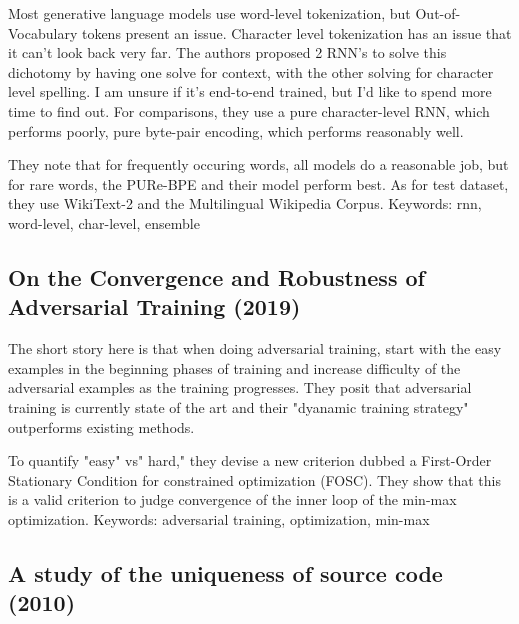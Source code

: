 \documentclass{article}
\begin{document}
Most generative language models use word-level tokenization, but Out-of-Vocabulary tokens present an issue. Character level tokenization has an issue that it can't look back very far. The authors proposed 2 RNN's to solve this dichotomy by having one solve for context, with the other solving for character level spelling. I am unsure if it's end-to-end trained, but I'd like to spend more time to find out. For comparisons, they use a pure character-level RNN, which performs poorly, pure byte-pair encoding, which performs reasonably well.

They note that for frequently occuring words, all models do a reasonable job, but for rare words, the PURe-BPE and their model perform best. As for test dataset, they use WikiText-2 and the Multilingual Wikipedia Corpus.
\newline\newline
Keywords: rnn, word-level, char-level, ensemble

\subsection*{On the Convergence and Robustness of Adversarial Training (2019)\cite{wang2019convergence}}

The short story here is that when doing adversarial training, start with the easy examples in the beginning phases of training and increase difficulty of the adversarial examples as the training progresses. They posit that adversarial training is currently state of the art and their "dyanamic training strategy" outperforms existing methods.

To quantify "easy" vs" hard," they devise a new criterion dubbed a First-Order Stationary Condition for constrained optimization (FOSC). They show that this is a valid criterion to judge convergence of the inner loop of the min-max optimization.
\newline\newline
Keywords: adversarial training, optimization, min-max

\subsection*{A study of the uniqueness of source code (2010)\cite{gabel2010study}}
\end{document}
